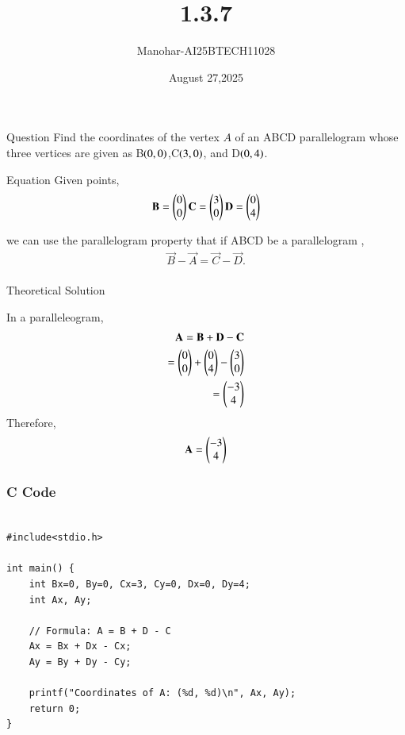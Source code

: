 \documentclass{beamer}
\title 
{1.3.7}
\date{August 27,2025}
\author 
{Manohar-AI25BTECH11028}
\begin{document}
\frame{\titlepage}
\begin{frame}{Question}
Find the coordinates of the  vertex $A$ of an ABCD parallelogram whose three vertices are given as B$\left(0,0\right)$,C$\left(3,0\right)$, and D$\left(0,4\right)$.
\end{frame}





\begin{frame}{Equation}
Given points,
\begin{align}
    \vec{B}=\begin{myvec}{0\\0}\end{myvec}
    \vec{C}=\begin{myvec}{3\\0}\end{myvec} \vec{D}=\begin{myvec}{0\\4}\end{myvec}
\end{align}

we can use the parallelogram property that if ABCD be a parallelogram ,
\begin{align}
\vec{B}-\vec{A}=\vec{C}-\vec{D
}.\\
\end{align}
\end{frame}
\begin{frame}{Theoretical Solution}

In a paralleleogram,
\begin{align}
\mathbf{A} = \mathbf{B} + \mathbf{D} - \mathbf{C}\\
        = \begin{pmatrix}0\\0\end{pmatrix} + \begin{pmatrix}0\\4\end{pmatrix} - \begin{pmatrix}3\\0\end{pmatrix}\\
= \begin{pmatrix}-3\\4\end{pmatrix}
\end{align}
Therefore,
\begin{align}
    \mathbf{A}=\begin{pmatrix}-3\\4\end{pmatrix}
\end{align}

\end{frame}


\begin{frame}[fragile]
    \frametitle{C Code}

    \begin{lstlisting}

#include<stdio.h>

int main() {
    int Bx=0, By=0, Cx=3, Cy=0, Dx=0, Dy=4;
    int Ax, Ay;

    // Formula: A = B + D - C
    Ax = Bx + Dx - Cx;
    Ay = By + Dy - Cy;

    printf("Coordinates of A: (%d, %d)\n", Ax, Ay);
    return 0;
}

    \end{lstlisting}
\end{frame}
\end{document}
